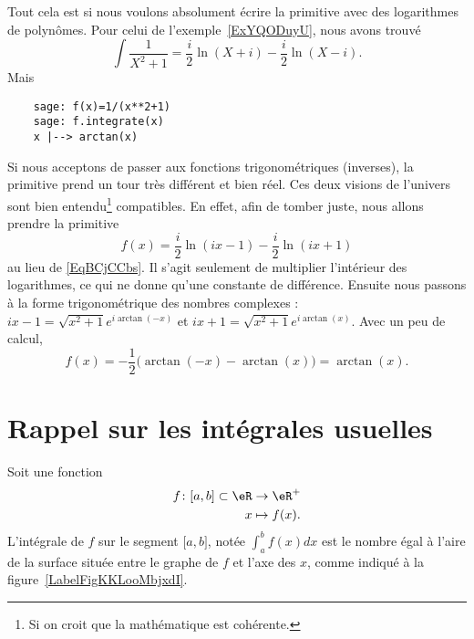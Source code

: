 \begin{remark}
    Tout cela est si nous voulons absolument écrire la primitive avec des logarithmes de polynômes. Pour celui de l'exemple~\ref{ExYQODuyU}, nous avons trouvé
    \begin{equation}    \label{EqBCjCCbs}
        \int\frac{1}{ X^2+1 }=\frac{ i }{2}\ln(X+i)-\frac{ i }{2}\ln(X-i).
    \end{equation}
    Mais
    \begin{verbatim}
    sage: f(x)=1/(x**2+1)
    sage: f.integrate(x)
    x |--> arctan(x)
    \end{verbatim}
    Si nous acceptons de passer aux fonctions trigonométriques (inverses), la primitive prend un tour très différent et bien réel. Ces deux visions de l'univers sont bien entendu\footnote{Si on croit que la mathématique est cohérente.} compatibles. En effet, afin de tomber juste, nous allons prendre la primitive
    \begin{equation}
        f(x)=\frac{ i }{2}\ln(ix-1)-\frac{ i }{2}\ln(ix+1)
    \end{equation}
    au lieu de \eqref{EqBCjCCbs}. Il s'agit seulement de multiplier l'intérieur des logarithmes, ce qui ne donne qu'une constante de différence. Ensuite nous passons à la forme trigonométrique des nombres complexes : \( ix-1=\sqrt{x^2+1} e^{i\arctan(-x)}\) et \( ix+1=\sqrt{x^2+1} e^{i\arctan(x)}\). Avec un peu de calcul,
    \begin{equation}
        f(x)=-\frac{ 1 }{2}\Big( \arctan(-x)-\arctan(x) \Big)=\arctan(x).
    \end{equation}
\end{remark}


\section{Rappel sur les intégrales usuelles}

Soit une fonction
\begin{equation}
    \begin{aligned}
        f\colon \mathopen[ a , b \mathclose]\subset\eR&\to \eR^+ \\
        x&\mapsto f(x) .
    \end{aligned}
\end{equation}
L'intégrale de $f$ sur le segment $\mathopen[ a , b \mathclose]$, notée $\int_a^bf(x)dx$ est le nombre égal à l'aire de la surface située entre le graphe de $f$ et l'axe des $x$, comme indiqué à la figure~\ref{LabelFigKKLooMbjxdI}. %
\newcommand{\CaptionFigKKLooMbjxdI}{L'intégrale de $f$ entre $a$ et $b$ représente la surface sous la fonction.}


